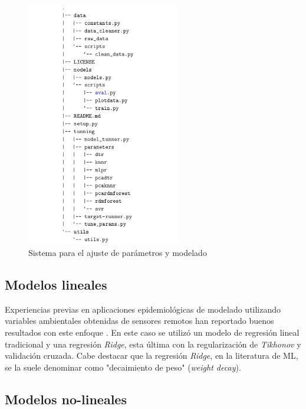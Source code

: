         \begin{figure}[hbt]
        \centering%
        \includegraphics[width=0.6\textwidth]{images/proyecto_modeling}%
        \caption{Sistema para el ajuste de parámetros y modelado}\label{fig:proyecto_modelado}
        \end{figure}



    \subsection{Modelos lineales}

      \par Experiencias previas en aplicaciones epidemiológicas de
        modelado utilizando variables ambientales obtenidas de sensores
        remotos han reportado buenos resultados con este
        enfoque \cite{akodon_modeling, multilinear_apli, modis_data}.
        En este caso se utilizó un modelo de regresión lineal tradicional y
        una regresión \textit{Ridge}, esta última con la regularización de
        \textit{Tikhonov} y validación cruzada. Cabe destacar que la
        regresión \textit{Ridge}, en la literatura de ML, se la suele denominar
        como "decaimiento de peso" (\textit{weight decay}).

  \subsection{Modelos no-lineales}

